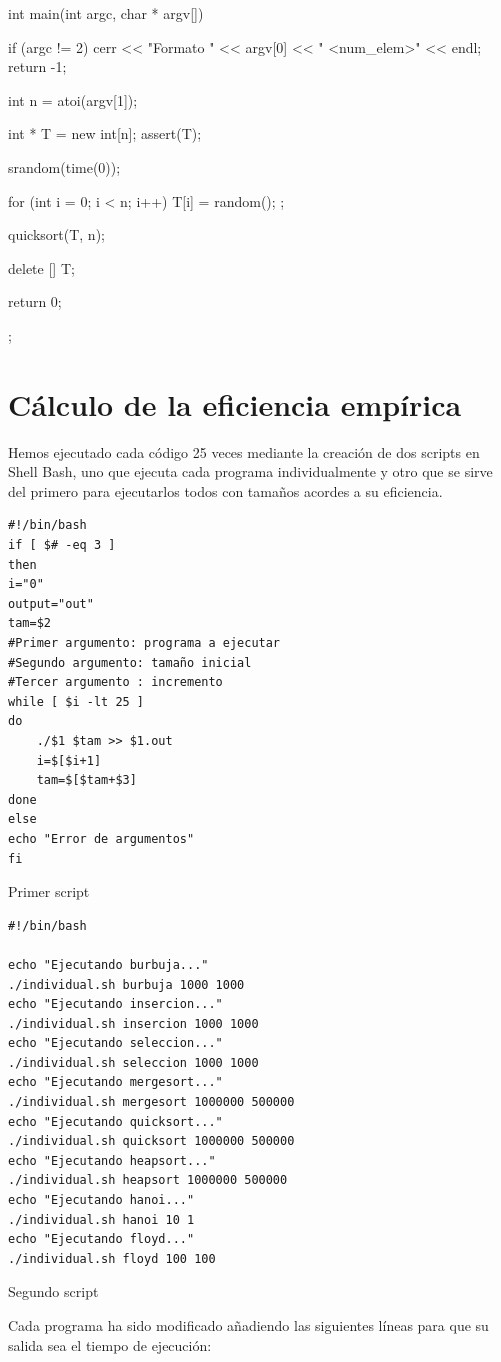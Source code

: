 \documentclass[12pt,spanish]{article}
\begin{document}
\begin{multicols}{2}
\begin{tcblisting}
int main(int argc, char * argv[])
{
    if (argc != 2)
    {
      cerr << "Formato " << argv[0] << " <num_elem>" << endl;
      return -1;
    }

  int n = atoi(argv[1]);

  int * T = new int[n];
  assert(T);

  srandom(time(0));

  for (int i = 0; i < n; i++)
    {
      T[i] = random();
    };

  quicksort(T, n);

  delete [] T;

  return 0;
};
\end{tcblisting}
\end{multicols}

\section{Cálculo de la eficiencia empírica}
Hemos ejecutado cada código 25 veces mediante la creación de dos scripts en Shell Bash, uno que ejecuta cada programa individualmente y otro que se sirve del primero para ejecutarlos todos con tamaños acordes a su eficiencia.
\begin{verbatim}
#!/bin/bash
if [ $# -eq 3 ]
then
i="0"
output="out"
tam=$2
#Primer argumento: programa a ejecutar
#Segundo argumento: tamaño inicial
#Tercer argumento : incremento
while [ $i -lt 25 ]
do
	./$1 $tam >> $1.out
	i=$[$i+1]
	tam=$[$tam+$3]
done
else
echo "Error de argumentos"
fi
\end{verbatim}
\begin{center}
Primer script
\end{center}
\newpage
\begin{verbatim}
#!/bin/bash

echo "Ejecutando burbuja..."
./individual.sh burbuja 1000 1000
echo "Ejecutando insercion..."
./individual.sh insercion 1000 1000
echo "Ejecutando seleccion..."
./individual.sh seleccion 1000 1000
echo "Ejecutando mergesort..."
./individual.sh mergesort 1000000 500000
echo "Ejecutando quicksort..."
./individual.sh quicksort 1000000 500000
echo "Ejecutando heapsort..."
./individual.sh heapsort 1000000 500000
echo "Ejecutando hanoi..."
./individual.sh hanoi 10 1
echo "Ejecutando floyd..."
./individual.sh floyd 100 100
\end{verbatim}
\begin{center}
Segundo script
\end{center}
Cada programa ha sido modificado añadiendo las siguientes líneas para que su salida sea el tiempo de ejecución:
\end{document}
